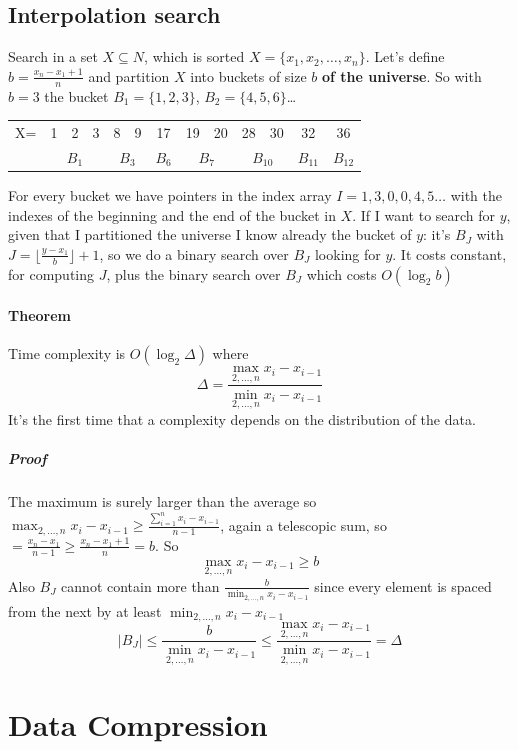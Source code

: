 \documentclass[10pt]{report}
\begin{document}
\subsection{Interpolation search} Search in a set $X \subseteq N$, which is sorted $X=\{x_1,x_2,\ldots,x_n\}$. Let's define $b = \frac{x_n - x_1 + 1}{n}$ and partition $X$ into buckets of size $b$ \textbf{of the universe}. So with $b= 3$ the bucket $B_1 = \{1,2,3\}$, $B_2 = \{4,5,6\}$\ldots
\begin{center}
	\begin{tabular}{c c c c | c c | c | c c | c c | c | c}
	X= & 1 & 2 & 3 & 8 & 9 & 17 & 19 & 20 & 28 & 30 & 32 & 36\\
	 & \multicolumn{3}{c}{$B_1$} & \multicolumn{2}{c}{$B_3$} & \multicolumn{1}{c}{$B_6$} & \multicolumn{2}{c}{$B_7$} & \multicolumn{2}{c}{$B_{10}$} & \multicolumn{1}{c}{$B_{11}$} & \multicolumn{1}{c}{$B_{12}$}
	\end{tabular}
\end{center}
For every bucket we have pointers in the index array $I = 1,3,0,0,4,5\ldots$ with the indexes of the beginning and the end of the bucket in $X$. If I want to search for $y$, given that I partitioned the universe I know already the bucket of $y$: it's $B_J$ with $J = \lfloor\frac{y-x_1}{b}\rfloor + 1$, so we do a binary search over $B_J$ looking for $y$. It costs constant, for computing $J$, plus the binary search over $B_J$ which costs $O(\log_2 b)$
\paragraph{Theorem} Time complexity is $O(\log_2 \Delta)$ where $$\Delta = \frac{\max_{2,\ldots,n} x_i - x_{i-1}}{\min_{2,\ldots,n} x_i - x_{i-1}}$$ It's the first time that a complexity depends on the distribution of the data.
\subparagraph{Proof} The maximum is surely larger than the average so $\max_{2,\ldots,n} x_i - x_{i-1} \geq \frac{\sum_{i=1}^n x_i - x_{i-1}}{n-1}$, again a telescopic sum, so $= \frac{x_n - x_1}{n-1} \geq \frac{x_n - x_1 + 1}{n} = b$. So $$\max_{2,\ldots,n} x_i - x_{i-1} \geq b$$
Also $B_J$ cannot contain more than $\frac{b}{\min_{2,\ldots,n} x_i - x_{i-1}}$ since every element is spaced from the next by at least $\min_{2,\ldots,n} x_i - x_{i-1}$
$$|B_J| \leq \frac{b}{\min_{2,\ldots,n} x_i - x_{i-1}} \leq \frac{\max_{2,\ldots,n} x_i - x_{i-1}}{\min_{2,\ldots,n} x_i - x_{i-1}} = \Delta$$
\section{Data Compression}
\end{document}
